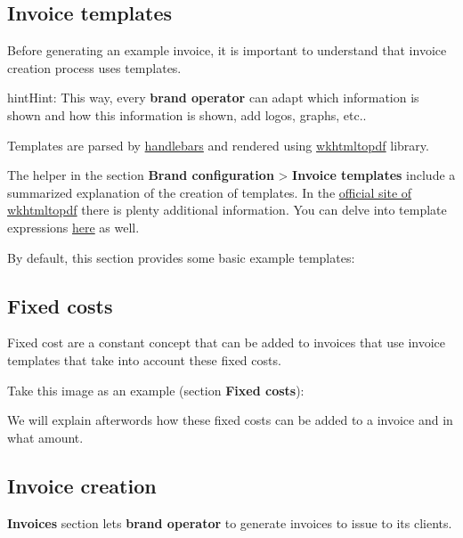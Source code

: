 \documentclass[letterpaper,10pt,english]{sphinxmanual}
\begin{document}
\subsection{Invoice templates}
\label{billing_and_invoices/invoices:invoice-templates}
Before generating an example invoice, it is important to understand that invoice
creation process uses templates.

\begin{notice}{hint}{Hint:}
This way, every \textbf{brand operator} can adapt which information
is shown and how this information is shown, add logos, graphs, etc..
\end{notice}

Templates are parsed by \href{https://github.com/XaminProject/handlebars.php}{handlebars} and rendered
using \href{https://wkhtmltopdf.org/}{wkhtmltopdf} library.

The helper in the section \textbf{Brand configuration} \textgreater{} \textbf{Invoice templates} include
a summarized explanation of the creation of templates. In the \href{https://wkhtmltopdf.org/usage/wkhtmltopdf.txt}{official site of wkhtmltopdf} there is plenty additional information.
You can delve into template expressions \href{http://handlebarsjs.com/expressions.html}{here} as well.

By default, this section provides some basic example templates:

\noindent{}


\subsection{Fixed costs}
\label{billing_and_invoices/invoices:fixed-costs}
Fixed cost are a constant concept that can be added to invoices that use invoice
templates that take into account these fixed costs.

Take this image as an example (section \textbf{Fixed costs}):

\noindent{}

We will explain afterwords how these fixed costs can be added to a invoice and
in what amount.


\subsection{Invoice creation}
\label{billing_and_invoices/invoices:invoice-creation}
\textbf{Invoices} section lets \textbf{brand operator} to generate invoices to issue to its
clients.
\end{document}
